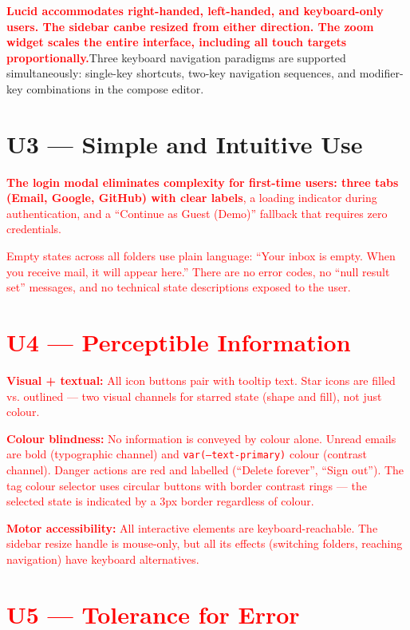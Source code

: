\documentclass[12pt,a4paper]{report}
\begin{document}
\textcolor{red}{\textbf{Lucid accommodates right-handed, left-handed, and keyboard-only users. The sidebar canbe resized from either direction. The zoom widget scales the entire interface, including all touch targets proportionally.}}Three keyboard navigation paradigms are supported
simultaneously: single-key shortcuts, two-key navigation sequences, and modifier-key
combinations in the compose editor.

\section{U3 — Simple and Intuitive Use}

\textcolor{red}{\textbf{{The login modal eliminates complexity for first-time users: three tabs (Email, Google,
GitHub) with clear labels}}, a loading indicator during authentication, and a ``Continue
as Guest (Demo)'' fallback that requires zero credentials.

Empty states across all folders use plain language: ``Your inbox is empty. When you receive
mail, it will appear here.'' There are no error codes, no ``null result set'' messages,
and no technical state descriptions exposed to the user.

\section{U4 — Perceptible Information}

\textbf{Visual + textual:} All icon buttons pair with tooltip text. Star icons are filled vs.
outlined — two visual channels for starred state (shape and fill), not just colour.

\textbf{Colour blindness:} No information is conveyed by colour alone. Unread emails are
bold (typographic channel) and \texttt{var(--text-primary)} colour (contrast channel).
Danger actions are red and labelled (``Delete forever'', ``Sign out''). The tag colour
selector uses circular buttons with border contrast rings — the selected state is indicated
by a 3px border regardless of colour.

\textbf{Motor accessibility:} All interactive elements are keyboard-reachable. The sidebar
resize handle is mouse-only, but all its effects (switching folders, reaching navigation)
have keyboard alternatives.

\section{U5 — Tolerance for Error}

}
\end{document}
